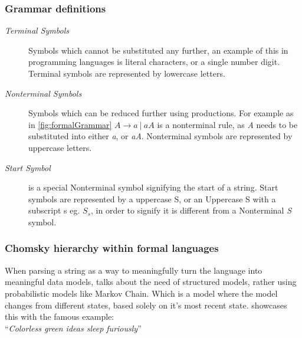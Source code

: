 \subsubsection{Grammar definitions}

\begin{description}
    \item[\textit{Terminal Symbols}] Symbols which cannot be substituted any further, an example of this in programming languages is literal characters, or a single number digit. Terminal symbols are represented by lowercase letters.
    
    \item[\textit{Nonterminal Symbols}] Symbols which can be reduced further using productions. For example as in \ref{fig:formalGrammar} $A \rightarrow a\ |\ aA$ is a nonterminal rule, as \textit{A} needs to be substituted into either \textit{a}, or \textit{aA}. Nonterminal symbols are represented by uppercase letters.

    \item[\textit{Start Symbol}] is a special Nonterminal symbol signifying the start of a string. Start symbols are represented by a uppercase S, or an Uppercase S with a subscript s eg. $S_s$, in order to signify it is different from a Nonterminal \textit{S} symbol.
\end{description}

\subsubsection{Chomsky hierarchy within formal languages}

When parsing a string as a way to meaningfully turn the language into meaningful data models, \autocite{Chomsky} talks about the need of structured models, rather using probabilistic models like Markov Chain. Which is a model where the model changes from different states, based solely on it's most recent state. \autocite{Chomsky} showcases this with the famous example: \\

``\emph{Colorless green ideas sleep furiously}'' \\

